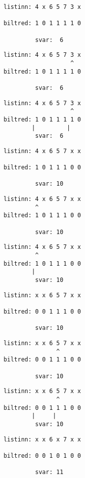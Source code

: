 { \begin{verbatim}
       listinn: 4 x 6 5 7 3 x

       biltred: 1 0 1 1 1 1 0

                svar:  6
\end{verbatim}}
{ \begin{verbatim}
       listinn: 4 x 6 5 7 3 x
                          ^
       biltred: 1 0 1 1 1 1 0

                svar:  6
\end{verbatim}}
{ \begin{verbatim}
       listinn: 4 x 6 5 7 3 x
                          ^
       biltred: 1 0 1 1 1 1 0
               |         |
                svar:  6
\end{verbatim}}
{ \begin{verbatim}
       listinn: 4 x 6 5 7 x x

       biltred: 1 0 1 1 1 0 0

                svar: 10
\end{verbatim}}
{ \begin{verbatim}
       listinn: 4 x 6 5 7 x x
                ^
       biltred: 1 0 1 1 1 0 0

                svar: 10
\end{verbatim}}
{ \begin{verbatim}
       listinn: 4 x 6 5 7 x x
                ^
       biltred: 1 0 1 1 1 0 0
               |
                svar: 10
\end{verbatim}}
{ \begin{verbatim}
       listinn: x x 6 5 7 x x

       biltred: 0 0 1 1 1 0 0

                svar: 10
\end{verbatim}}
{ \begin{verbatim}
       listinn: x x 6 5 7 x x
                      ^
       biltred: 0 0 1 1 1 0 0

                svar: 10
\end{verbatim}}
{ \begin{verbatim}
       listinn: x x 6 5 7 x x
                      ^
       biltred: 0 0 1 1 1 0 0
               |     |
                svar: 10
\end{verbatim}}
{ \begin{verbatim}
       listinn: x x 6 x 7 x x

       biltred: 0 0 1 0 1 0 0

                svar: 11
\end{verbatim}}
